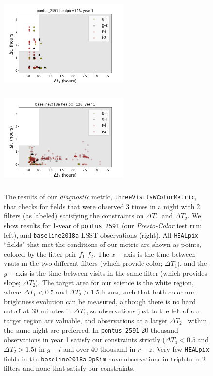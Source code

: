 \documentclass[12pt, letterpaper]{article}
\newcommand{\dtone}{\ensuremath{\Delta T_1}}
\newcommand{\dttwo}{\ensuremath{\Delta T_2}}
\begin{document}
\begin{figure}[!ht]
\begin{center}
\includegraphics[width=6.5cm,height=5cm]{figures/3visits_pontus_2591_grgzriiz.png}
\includegraphics[width=6.5cm,height=5cm]{figures/3visits_baseline2018a_grgzriiz.png}
\caption{{\footnotesize The results of our {\em diagnostic} metric, {\tt threeVisitsWColorMetric}, that checks for fields that were observed 3 times in a night with 2 filters (as labeled) satisfying the constraints on \dtone\ and \dttwo. We show results for 1-year of {\tt pontus\_2591} (our {\em Presto-Color} test run; left), and {\tt baseline2018a} LSST observations (right). All {\tt HEALpix} ``fields" that met the conditions of our metric are shown as points, colored by the filter pair $f_1$-$f_2$. The $x-$axis is the time between visits in the two different filters (which provide color; \dtone), and the $y-$axis is the time between visits in the same filter (which provides slope; \dttwo). The target area for our science is the white region, where $\dtone<0.5$ and $\dttwo>1.5$ hours, such that both color and brightness evolution can be measured, although there is no hard cutoff at 30 minutes in \dtone, so observations just to the left of our target region are valuable, and observations at a larger \dttwo~ within the same night are preferred.
In {\tt pontus\_2591} 20 thousand observations in year 1 satisfy our constraints strictly ($\dtone<0.5$ and $\dttwo>1.5$) in $g-i$ and over 40 thousand in $r-z$.
Very few {\tt HEALpix} fields in the {\tt baseline2018a} {\tt OpSim} have observations in triplets in 2 filters and none that satisfy our constraints.}}
\end{center}
\end{figure}
\end{document}

